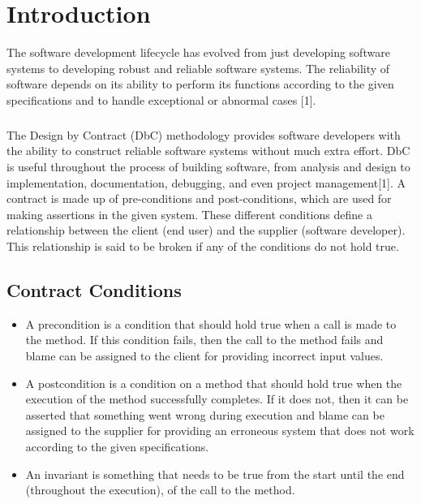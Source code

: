 \chapter{Introduction}

The software development lifecycle has evolved from just developing software systems to developing robust and reliable software systems. The reliability of software depends on its ability to perform its functions according to the given specifications and to handle exceptional or abnormal cases [1].
\paragraph{}
The Design by Contract (DbC) methodology provides software developers with the ability to construct reliable software systems without much extra effort. DbC is useful throughout the process of building software, from analysis and design to implementation, documentation, debugging, and even project management[1]. A contract is made up of pre-conditions and post-conditions, which are used for making assertions in the given system. These different conditions define a relationship between the client (end user) and the supplier (software developer). This relationship is said to be broken if any of the conditions do not hold true.



\section{Contract Conditions}

\begin{itemize}
\item A precondition is a condition that should hold true when a call is made to the method. If this condition fails, then the call to the method fails and blame can be assigned to the client for providing incorrect input values.
\item A postcondition is a condition on a method that should hold true when the execution of the method successfully completes. If it does not, then it can be asserted that something went wrong during execution and blame can be assigned to the supplier for providing an erroneous system that does not work according to the given specifications.
\item An invariant is something that needs to be true from the start until the end (throughout the execution), of the call to the method.
\end{itemize}

